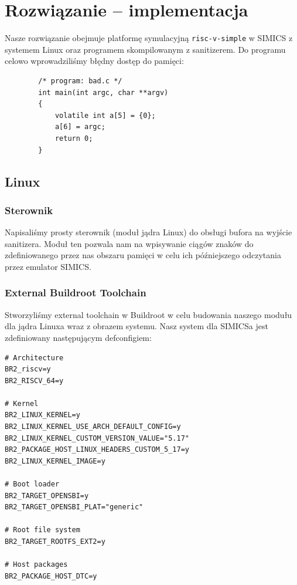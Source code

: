 \documentclass[../main.tex]{subfiles}
\begin{document}
\section{Rozwiązanie -- implementacja}
Nasze rozwiązanie obejmuje platformę symulacyjną \texttt{risc-v-simple} w SIMICS z systemem Linux oraz programem skompilowanym z sanitizerem. Do programu celowo wprowadziliśmy błędny dostęp do pamięci:

\begin{listing}[H]
	\begin{verbatim}
		/* program: bad.c */
		int main(int argc, char **argv)
		{
			volatile int a[5] = {0};
			a[6] = argc;
			return 0;
		}
	\end{verbatim}
\end{listing}

\subsection{Linux}

\subsubsection{Sterownik}
Napisaliśmy prosty sterownik (moduł jądra Linux) do obsługi bufora na wyjście sanitizera. Moduł ten pozwala nam na wpisywanie ciągów znaków do zdefiniowanego przez nas obszaru pamięci w celu ich późniejszego odczytania przez emulator SIMICS.


\subsubsection{External Buildroot Toolchain}
Stworzyliśmy external toolchain w Buildroot w celu budowania naszego modułu dla jądra Linuxa wraz z obrazem systemu. Nasz system dla SIMICSa jest zdefiniowany następującym defconfigiem:

\begin{listing}[H]
	\begin{verbatim}
# Architecture
BR2_riscv=y
BR2_RISCV_64=y

# Kernel
BR2_LINUX_KERNEL=y
BR2_LINUX_KERNEL_USE_ARCH_DEFAULT_CONFIG=y
BR2_LINUX_KERNEL_CUSTOM_VERSION_VALUE="5.17"
BR2_PACKAGE_HOST_LINUX_HEADERS_CUSTOM_5_17=y
BR2_LINUX_KERNEL_IMAGE=y

# Boot loader
BR2_TARGET_OPENSBI=y
BR2_TARGET_OPENSBI_PLAT="generic"

# Root file system
BR2_TARGET_ROOTFS_EXT2=y

# Host packages
BR2_PACKAGE_HOST_DTC=y
		\end{verbatim}
	\end{listing}
\end{document}
